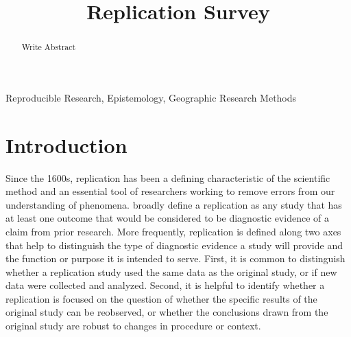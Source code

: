 \documentclass[]{interact}
\theoremstyle{plain}%
\theoremstyle{definition}
\theoremstyle{remark}
\begin{document}

\title{Replication Survey}

\author{
}

\maketitle

\begin{abstract}
Write Abstract

\end{abstract}

\begin{keywords}
Reproducible Research, Epistemology, Geographic Research Methods
\end{keywords}

\newpage
\section*{Introduction}
Since the 1600s, replication has been a defining characteristic of the scientific method and an essential tool of researchers working to remove errors from our understanding of phenomena. 
\citet{nosek2020} broadly define a replication as any study that has at least one outcome that would be considered to be diagnostic evidence of a claim from prior research.
More frequently, replication is defined along two axes that help to distinguish the type of diagnostic evidence a study will provide and the function or purpose it is intended to serve. 
First, it is common to distinguish whether a replication study used the same data as the original study, or if new data were collected and analyzed. 
Second, it is helpful to identify whether a replication is focused on the question of whether the specific results of the original study can be reobserved, or whether the conclusions drawn from the original study are robust to changes in procedure or context.
\end{document}
